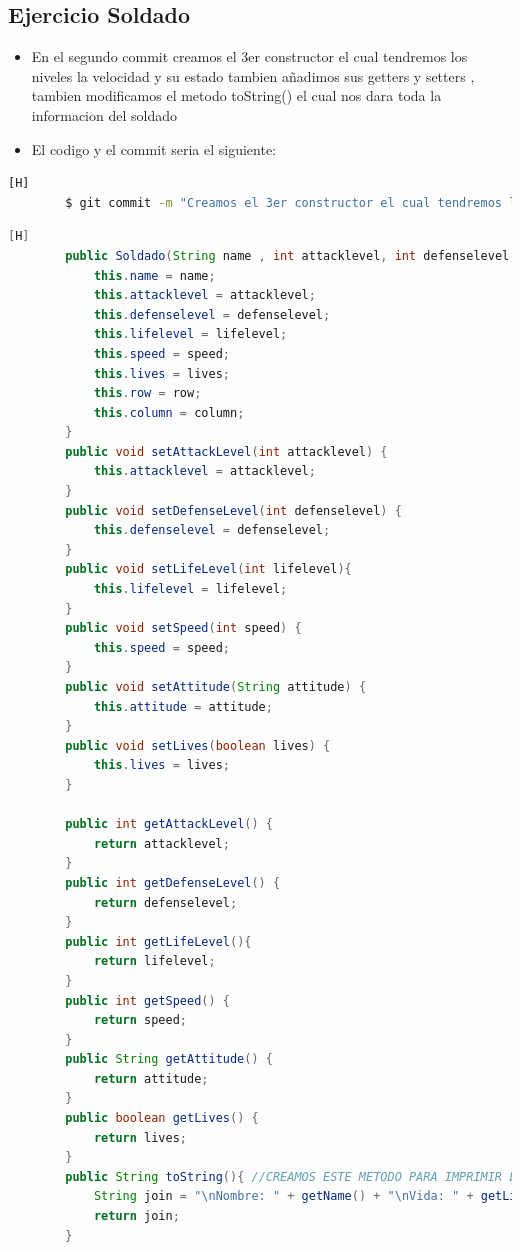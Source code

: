 \documentclass{article}
\begin{document}
	\subsection{Ejercicio Soldado}
	\begin{itemize}	
		\item En el segundo commit creamos el 3er constructor el cual tendremos los niveles la velocidad y su estado tambien añadimos sus getters y setters , tambien modificamos el metodo toString() el cual nos dara toda la informacion del soldado
		\item El codigo y el commit seria el siguiente:
	\end{itemize}	
	\begin{lstlisting}[language=bash,caption={Commit}][H]
		$ git commit -m "Creamos el 3er constructor el cual tendremos los niveles la velocidad y su estado tambien anadimos sus getters y setters , tambien modificamos el metodo toString() el cual nos dara toda la informacion del soldado"
	\end{lstlisting}	
	\begin{lstlisting}[language=java,caption={Las lineas de codigos del metodo creado:}][H]
		public Soldado(String name , int attacklevel, int defenselevel, int lifelevel, int speed, boolean lives, int row, String column) {
			this.name = name;
			this.attacklevel = attacklevel;
			this.defenselevel = defenselevel;
			this.lifelevel = lifelevel;
			this.speed = speed;
			this.lives = lives;
			this.row = row;
			this.column = column;
		}
		public void setAttackLevel(int attacklevel) {
			this.attacklevel = attacklevel;
		}
		public void setDefenseLevel(int defenselevel) {
			this.defenselevel = defenselevel;
		}
		public void setLifeLevel(int lifelevel){
			this.lifelevel = lifelevel;
		}
		public void setSpeed(int speed) {
			this.speed = speed;
		}
		public void setAttitude(String attitude) {
			this.attitude = attitude;
		}
		public void setLives(boolean lives) {
			this.lives = lives;
		}

		public int getAttackLevel() {
			return attacklevel;
		}
		public int getDefenseLevel() {
			return defenselevel;
		}
		public int getLifeLevel(){
			return lifelevel;
		}
		public int getSpeed() {
			return speed;
		}
		public String getAttitude() {
			return attitude;
		}
		public boolean getLives() {
			return lives;
		}
		public String toString(){ //CREAMOS ESTE METODO PARA IMPRIMIR LOS DATOS DEl OBJETO
			String join = "\nNombre: " + getName() + "\nVida: " + getLifeActual() + "\nFila: " + getRow() + "\nColumna: " + getColumn() + "\nNivel de ataque: " + getAttackLevel() + "\nNivel de Defensa: " + getDefenseLevel() + "\nNivel de vida: " + getLifeLevel() + "\nVelocidad: " + getSpeed() + "\nActitud: " + getAttitude() + "\nEstado: " + getLives(); //Agregamos un espaciador para poder separar
        	return join;
    	}

	\end{lstlisting}
\end{document}
